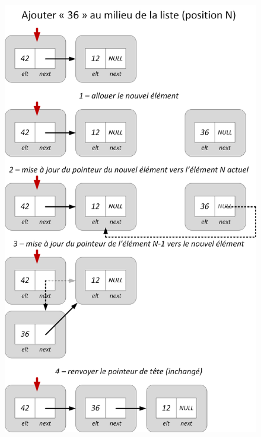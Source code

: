 \documentclass[11pt,a4paper]{article}
\begin{document}
\begin{figure}[ht!]
\centering
\centerline{   %
\includegraphics[scale=0.73]{img/listes/Listes_Pointeurs_3_2_ajout_milieu.png}
}
\end{figure}

\vfillLast
\end{document}
